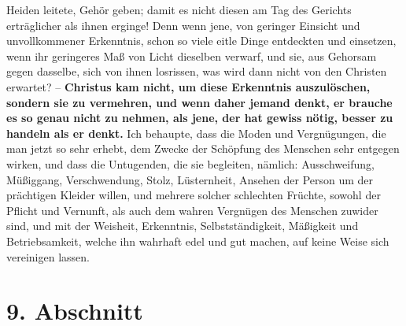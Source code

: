 Heiden leitete,
Gehör geben;
damit es nicht diesen am Tag des Gerichts erträglicher
als ihnen erginge! Denn
wenn jene, von geringer Einsicht und unvollkommener Erkenntnis, schon so viele
eitle Dinge entdeckten und einsetzen, wenn ihr geringeres Maß von Licht
dieselben verwarf, und sie, aus Gehorsam gegen dasselbe, sich von ihnen
losrissen, was wird dann nicht von den Christen erwartet? --
\label{ref:14_08_wahre_nachfolger_rational}
\textbf{Christus kam nicht,
um diese Erkenntnis auszulöschen, sondern sie zu vermehren, und wenn daher
jemand denkt, er brauche es so genau nicht zu nehmen, als jene, der hat gewiss
nötig, besser zu handeln als er denkt.} Ich behaupte, dass die Moden und
Vergnügungen, die man jetzt so sehr erhebt, dem Zwecke der Schöpfung des
Menschen sehr entgegen wirken, und dass die Untugenden, die sie begleiten,
nämlich: Ausschweifung, Müßiggang,
Verschwendung, Stolz, Lüsternheit, Ansehen
der Person um der prächtigen Kleider willen, und mehrere solcher schlechten
Früchte, sowohl der Pflicht und Vernunft, als auch dem wahren Vergnügen des
Menschen zuwider sind, und mit der Weisheit, Erkenntnis, Selbstständigkeit,
Mäßigkeit und Betriebsamkeit, welche ihn wahrhaft edel und gut
machen, auf keine
Weise sich vereinigen lassen.

\section{9. Abschnitt} \label{kap14_ab9}

